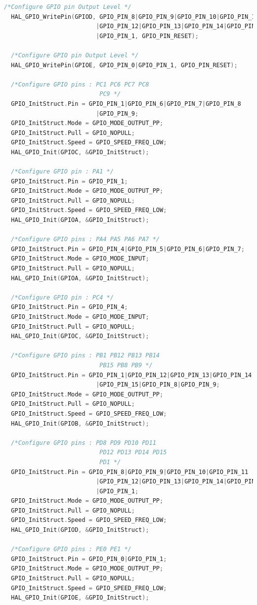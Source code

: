 \begin{lstlisting}[language = c]
  /*Configure GPIO pin Output Level */
  HAL_GPIO_WritePin(GPIOD, GPIO_PIN_8|GPIO_PIN_9|GPIO_PIN_10|GPIO_PIN_11 
                          |GPIO_PIN_12|GPIO_PIN_13|GPIO_PIN_14|GPIO_PIN_15 
                          |GPIO_PIN_1, GPIO_PIN_RESET);

  /*Configure GPIO pin Output Level */
  HAL_GPIO_WritePin(GPIOE, GPIO_PIN_0|GPIO_PIN_1, GPIO_PIN_RESET);

  /*Configure GPIO pins : PC1 PC6 PC7 PC8 
                           PC9 */
  GPIO_InitStruct.Pin = GPIO_PIN_1|GPIO_PIN_6|GPIO_PIN_7|GPIO_PIN_8 
                          |GPIO_PIN_9;
  GPIO_InitStruct.Mode = GPIO_MODE_OUTPUT_PP;
  GPIO_InitStruct.Pull = GPIO_NOPULL;
  GPIO_InitStruct.Speed = GPIO_SPEED_FREQ_LOW;
  HAL_GPIO_Init(GPIOC, &GPIO_InitStruct);

  /*Configure GPIO pin : PA1 */
  GPIO_InitStruct.Pin = GPIO_PIN_1;
  GPIO_InitStruct.Mode = GPIO_MODE_OUTPUT_PP;
  GPIO_InitStruct.Pull = GPIO_NOPULL;
  GPIO_InitStruct.Speed = GPIO_SPEED_FREQ_LOW;
  HAL_GPIO_Init(GPIOA, &GPIO_InitStruct);

  /*Configure GPIO pins : PA4 PA5 PA6 PA7 */
  GPIO_InitStruct.Pin = GPIO_PIN_4|GPIO_PIN_5|GPIO_PIN_6|GPIO_PIN_7;
  GPIO_InitStruct.Mode = GPIO_MODE_INPUT;
  GPIO_InitStruct.Pull = GPIO_NOPULL;
  HAL_GPIO_Init(GPIOA, &GPIO_InitStruct);

  /*Configure GPIO pin : PC4 */
  GPIO_InitStruct.Pin = GPIO_PIN_4;
  GPIO_InitStruct.Mode = GPIO_MODE_INPUT;
  GPIO_InitStruct.Pull = GPIO_NOPULL;
  HAL_GPIO_Init(GPIOC, &GPIO_InitStruct);

  /*Configure GPIO pins : PB1 PB12 PB13 PB14 
                           PB15 PB8 PB9 */
  GPIO_InitStruct.Pin = GPIO_PIN_1|GPIO_PIN_12|GPIO_PIN_13|GPIO_PIN_14 
                          |GPIO_PIN_15|GPIO_PIN_8|GPIO_PIN_9;
  GPIO_InitStruct.Mode = GPIO_MODE_OUTPUT_PP;
  GPIO_InitStruct.Pull = GPIO_NOPULL;
  GPIO_InitStruct.Speed = GPIO_SPEED_FREQ_LOW;
  HAL_GPIO_Init(GPIOB, &GPIO_InitStruct);

  /*Configure GPIO pins : PD8 PD9 PD10 PD11 
                           PD12 PD13 PD14 PD15 
                           PD1 */
  GPIO_InitStruct.Pin = GPIO_PIN_8|GPIO_PIN_9|GPIO_PIN_10|GPIO_PIN_11 
                          |GPIO_PIN_12|GPIO_PIN_13|GPIO_PIN_14|GPIO_PIN_15 
                          |GPIO_PIN_1;
  GPIO_InitStruct.Mode = GPIO_MODE_OUTPUT_PP;
  GPIO_InitStruct.Pull = GPIO_NOPULL;
  GPIO_InitStruct.Speed = GPIO_SPEED_FREQ_LOW;
  HAL_GPIO_Init(GPIOD, &GPIO_InitStruct);

  /*Configure GPIO pins : PE0 PE1 */
  GPIO_InitStruct.Pin = GPIO_PIN_0|GPIO_PIN_1;
  GPIO_InitStruct.Mode = GPIO_MODE_OUTPUT_PP;
  GPIO_InitStruct.Pull = GPIO_NOPULL;
  GPIO_InitStruct.Speed = GPIO_SPEED_FREQ_LOW;
  HAL_GPIO_Init(GPIOE, &GPIO_InitStruct);


\end{lstlisting}

